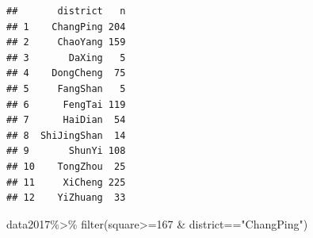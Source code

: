 \documentclass[
]{article}
\newenvironment{Shaded}{\begin{snugshade}}{\end{snugshade}}
\newcommand{\DecValTok}[1]{\textcolor[rgb]{0.00,0.00,0.81}{#1}}
\newcommand{\FunctionTok}[1]{\textcolor[rgb]{0.00,0.00,0.00}{#1}}
\newcommand{\NormalTok}[1]{#1}
\newcommand{\SpecialCharTok}[1]{\textcolor[rgb]{0.00,0.00,0.00}{#1}}
\newcommand{\StringTok}[1]{\textcolor[rgb]{0.31,0.60,0.02}{#1}}
\begin{document}
\begin{verbatim}
##       district   n
## 1    ChangPing 204
## 2     ChaoYang 159
## 3       DaXing   5
## 4    DongCheng  75
## 5     FangShan   5
## 6      FengTai 119
## 7      HaiDian  54
## 8  ShiJingShan  14
## 9       ShunYi 108
## 10    TongZhou  25
## 11     XiCheng 225
## 12    YiZhuang  33
\end{verbatim}

\begin{Shaded}
\begin{Highlighting}[]
\NormalTok{data2017}\SpecialCharTok{\%\textgreater{}\%}
  \FunctionTok{filter}\NormalTok{(square}\SpecialCharTok{\textgreater{}=}\DecValTok{167} \SpecialCharTok{\&}\NormalTok{ district}\SpecialCharTok{==}\StringTok{"ChangPing"}\NormalTok{)}
\end{Highlighting}
\end{Shaded}
\end{document}
